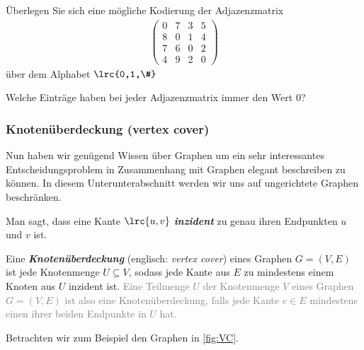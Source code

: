 \begin{myexercise}\label{myexercise:0300}
	Überlegen Sie sich eine mögliche Kodierung der Adjazenzmatrix
	\begin{align*}
		\left( \begin{matrix} 0 & 7 & 3 & 5 \\ 8 & 0 & 1 & 4 \\ 7 & 6 & 0 & 2 \\ 4 & 9 & 2 & 0 \end{matrix} \right)
	\end{align*}
	über dem Alphabet $\lrc{0,1,\#}$
\end{myexercise}

\begin{myexercise}\label{myexercise:0301}
	Welche Einträge haben bei jeder Adjazenzmatrix immer den Wert 0?
\end{myexercise}

\subsubsection{Knotenüberdeckung (vertex cover)}
Nun haben wir genügend Wissen über Graphen um ein sehr interessantes Entscheidungsproblem in Zusammenhang mit Graphen elegant beschreiben zu können. In diesem Unterunterabschnitt werden wir uns auf ungerichtete Graphen beschränken.
\begin{mydefinition}\label{mydefinition:knotenueberdeckung}
Man sagt, dass eine Kante $\lrc{u,v}$ \textbf{\textit{inzident}} zu genau ihren Endpunkten $u$ und $v$ ist.

Eine \textbf{\textit{Knotenüberdeckung}} (englisch: \textit{vertex cover}) eines Graphen $G = (V,E)$ ist jede Knotenmenge $U\subseteq V$, sodass jede Kante aus $E$ zu mindestens einem Knoten aus $U$ inzident ist.
\textcolor{Gray}{Eine Teilmenge $U$ der Knotenmenge $V$ eines Graphen $G=(V,E)$ ist also eine Knotenüberdeckung, falls jede Kante $e\in E$ mindestens einen ihrer beiden Endpunkte in $U$ hat.}
\end{mydefinition}
Betrachten wir zum Beispiel den Graphen in \cref{fig:VC}.

